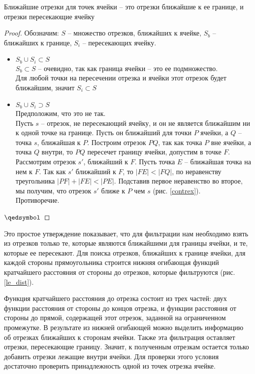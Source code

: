 {\prop\label{cl_segs}
Ближайшие отрезки для точек ячейки -- это отрезки ближайшие к ее границе, и отрезки пересекающие ячейку}
\begin{proof}
Обозначим: $S$ -- множество отрезков, ближайших к ячейке, $S_b$ -- ближайших к границе, $S_i$ --
пересекающих ячейку.
\begin{itemize}
\item $S_b \cup S_i \subset S$ \\
$S_b \subset S$ -- очевидно, так как граница ячейки -- это ее подмножество.\\
Для любой точки на пересечении отрезка и ячейки этот отрезок будет
ближайшим, значит $S_i \subset S$
\item $S_b \cup S_i \supset S$ \\
Предположим, что это не так.\\Пусть $s$ -- отрезок, не пересекающий
ячейку, и он не является ближайшим ни к одной точке на границе. Пусть
он ближайший для точки $P$ ячейки, а $Q$ -- точка $s$, ближайшая к $P$.
Построим отрезок $PQ$, так как точка $P$ вне ячейки, а точка $Q$ внутри, то $PQ$
пересечет границу ячейки, допустим в точке $F$. Рассмотрим отрезок $s'$,
ближайший к $F$. Пусть точка $E$ -- ближайшая точка на нем к $F$.
Так как $s'$ ближайший к $F$, то $|FE| < |FQ|$, по неравенству треугольника $|PF|
+ |FE| < |PE|$. Подставив первое неравенство во второе, мы получим, что
отрезок $s'$ ближе к $P$ чем $s$ (рис. \ref{contrex}).\\
Противоречие.
\end{itemize}
$\qedsymbol$
\end{proof}

Это простое утверждение показывает, что для фильтрации нам
необходимо взять из отрезков только те, которые являются ближайшими для
границы ячейки, и те, которые ее пересекают.
Для поиска отрезков, ближайших к границе ячейки, для каждой стороны
прямоугольника строится нижняя огибающая функций кратчайшего расстояния от
стороны до отрезков, которые фильтруются (рис. \ref{le_dist}).

Функция кратчайшего расстояния до отрезка состоит из трех частей: двух функции расстояния от
стороны до концов отрезка, и функции расстояния от стороны до прямой,
содержащей этот отрезок, заданной на ограниченном промежутке. В результате
из нижней огибающей можно выделить информацию об отрезках ближайших к
сторонам ячейки. Также эта фильтрация оставляет отрезки, пересекающие
границу. Значит, к полученным отрезкам остается только добавить отрезки
лежащие внутри ячейки. Для проверки этого условия достаточно проверить
принадлежность одной из точек отрезка ячейке.

